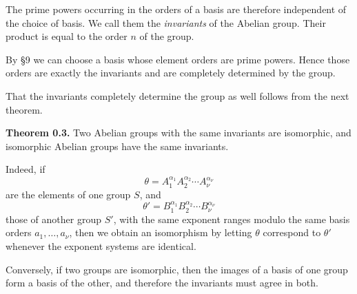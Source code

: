 \documentclass[11pt]{article}
\begin{document}
The prime powers occurring in the orders of a basis are therefore independent of the choice of basis. We call them the \emph{invariants} of the Abelian group. Their product is equal to the order \(n\) of the group.

By \S 9 we can choose a basis whose element orders are prime powers. Hence those orders are exactly the invariants and are completely determined by the group.

That the invariants completely determine the group as well follows from the next theorem.

\medskip
\noindent\textbf{Theorem 0.3.}
Two Abelian groups with the same invariants are isomorphic, and isomorphic Abelian groups have the same invariants.

\medskip
Indeed, if
\[
\theta=A_1^{\alpha_1}A_2^{\alpha_2}\cdots A_\nu^{\alpha_\nu}
\]
are the elements of one group \(S\), and
\[
\theta'=B_1^{\alpha_1}B_2^{\alpha_2}\cdots B_\nu^{\alpha_\nu}
\]
those of another group \(S'\), with the same exponent ranges modulo the same basis orders \(a_1,\dots,a_\nu\), then we obtain an isomorphism by letting \(\theta\) correspond to \(\theta'\) whenever the exponent systems are identical.

Conversely, if two groups are isomorphic, then the images of a basis of one group form a basis of the other, and therefore the invariants must agree in both.
\end{document}
